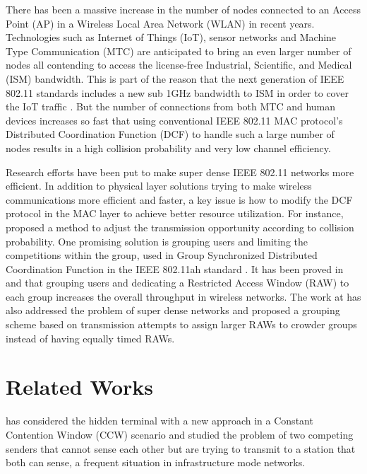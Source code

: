 \label{chapter:single}

There has been a massive increase in the number of nodes connected to an Access Point (AP) in a Wireless Local Area Network (WLAN) in recent years. Technologies such as Internet of Things (IoT), sensor networks and Machine Type Communication (MTC) are anticipated to bring an even larger number of nodes all contending to access the license-free Industrial, Scientific, and Medical (ISM) bandwidth. This is part of the reason that the next generation of IEEE 802.11 standards includes a new sub 1GHz bandwidth to ISM in order to cover the IoT traffic \cite{Req80211ah}. But the number of connections from both MTC and human devices increases so fast that using conventional IEEE 802.11 MAC protocol's Distributed Coordination Function (DCF) to handle such a large number of nodes results in a high collision probability and very low channel efficiency.

Research efforts have been put to make super dense IEEE 802.11 networks more efficient. In addition to physical layer solutions trying to make wireless communications more efficient and faster, a key issue is how to modify the DCF protocol in the MAC layer to achieve better resource utilization. For instance, \cite{zhong2014dcf} proposed a method to adjust the transmission opportunity according to collision probability. One promising solution is grouping users and limiting the competitions within the group, used in Group Synchronized Distributed Coordination Function in the IEEE 802.11ah standard \cite{Draft80211ah}. It has been proved in \cite{zheng2014performance} and \cite{raeesi2014performance} that grouping users and dedicating a Restricted Access Window (RAW) to each group increases the overall throughput in wireless networks. The work at \cite{kim2015optimal} has also addressed the problem of super dense networks and proposed a grouping scheme based on transmission attempts to assign larger RAWs to crowder groups instead of having equally timed RAWs. 


\section{Related Works}

\cite{tsertou2008revisiting} has considered the hidden terminal with a new approach in a Constant Contention Window (CCW) scenario and studied the problem of two competing senders that cannot sense each other but are trying to transmit to a station that both can sense, a frequent situation in infrastructure mode networks.

